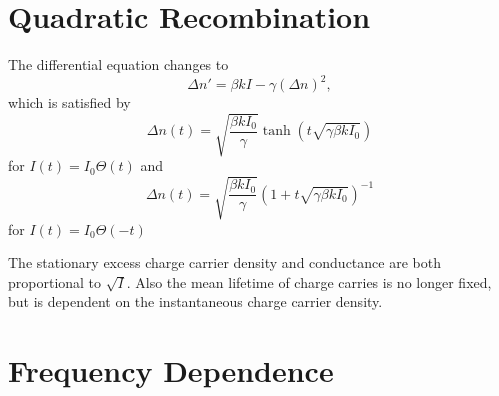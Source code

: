 \section{Quadratic Recombination}
The differential equation changes to
\begin{equation*}
	\Delta n' = \beta k I - \gamma (\Delta n)^2,
\end{equation*}
which is satisfied by
\begin{equation*}
	\Delta n (t) = \sqrt{\frac{\beta k I_0}{\gamma}} \tanh \left(t \sqrt{\gamma \beta k I_0} \right)
\end{equation*}
for $I(t) = I_0 \Theta (t)$ and
\begin{equation*}
	\Delta n (t) = \sqrt{\frac{\beta k I_0}{\gamma}} \left(1 + t \sqrt{\gamma \beta k I_0} \right)^{-1}
\end{equation*}
for $I(t) = I_0 \Theta (-t)$

The stationary excess charge carrier density and conductance are both proportional to $\sqrt{I}$.
Also the mean lifetime of charge carries is no longer fixed, but is dependent on the instantaneous charge carrier density.

\section{Frequency Dependence}
